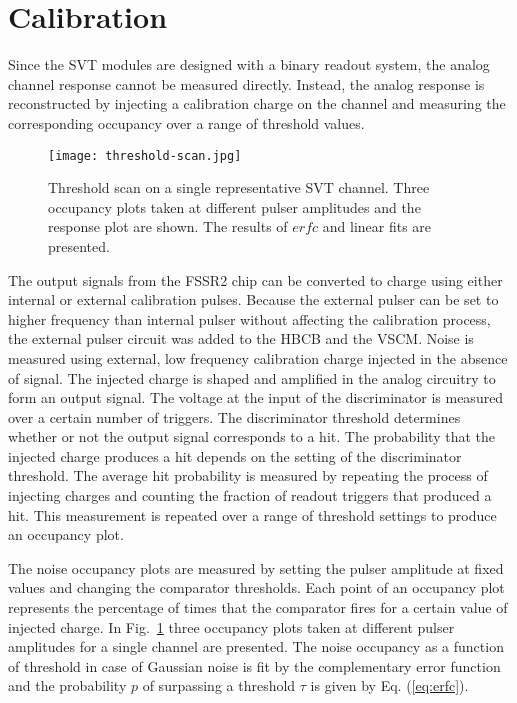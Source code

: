 \section{Calibration}

Since the SVT modules are designed with a binary readout system, the analog channel response cannot be measured directly. Instead, the analog response is reconstructed by injecting a calibration charge on the channel and measuring the corresponding occupancy over a range of threshold values. 

\begin{figure}[hbt] 
	\centering 
	\texttt{[image: threshold-scan.jpg]}
	\caption{Threshold scan on a single representative SVT channel. Three occupancy plots taken at different pulser amplitudes and the response plot are shown. The results of $erfc$ and linear fits are presented.}
	\label{fig:threshold-scan}
\end{figure}

The output signals from the FSSR2 chip can be converted to charge using either internal or external calibration pulses. Because the external pulser can be set to higher frequency than internal pulser without affecting the calibration process, the external pulser circuit was added to the HBCB and the VSCM. Noise is measured using external, low frequency calibration charge injected in the absence of signal. The injected charge is shaped and amplified in the analog circuitry to form an output signal. The voltage at the input of the discriminator is measured over a certain number of triggers. The discriminator threshold determines whether or not the output signal corresponds to a hit. The probability that the injected charge produces a hit depends on the setting of the discriminator threshold. The average hit probability is measured by repeating the process of injecting charges and counting the fraction of readout triggers that produced a hit. This measurement is repeated over a range of threshold settings to produce an occupancy plot. 

The noise occupancy plots are measured by setting the pulser amplitude at fixed values and changing the comparator thresholds. Each point of an occupancy plot represents the percentage of times that the comparator fires for a certain value of injected charge. In Fig.~\ref{fig:threshold-scan} three occupancy plots taken at different pulser amplitudes for a single channel are presented. The noise occupancy as a function of threshold in case of Gaussian noise is fit by the complementary error function and the probability $p$ of surpassing a threshold $\tau$ is given by Eq. (\ref{eq:erfc}). 

